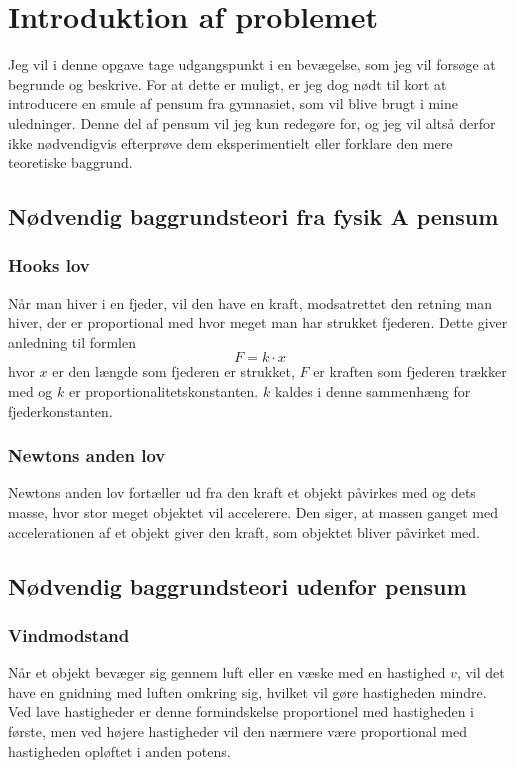 \chapter{Introduktion af problemet}
Jeg vil i denne opgave tage udgangspunkt i en bevægelse, som jeg vil forsøge at begrunde og beskrive. 
For at dette er muligt, er jeg dog nødt til kort at introducere en smule af pensum fra gymnasiet, som vil blive brugt i mine uledninger. 
Denne del af pensum vil jeg kun redegøre for, og jeg vil altså derfor ikke nødvendigvis efterprøve dem eksperimentielt eller forklare den mere teoretiske baggrund. 

\section{Nødvendig baggrundsteori fra fysik A pensum}
\subsection{Hooks lov}\label{teori:Hooks lov}
Når man hiver i en fjeder, vil den have en kraft, modsatrettet den retning man hiver, der er proportional med hvor meget man har strukket fjederen. 
Dette giver anledning til formlen 
$$F =k\cdot x$$
hvor $x$ er den længde som fjederen er strukket, $F$ er kraften som fjederen trækker med og $k$ er proportionalitetskonstanten. 
$k$ kaldes i denne sammenhæng for fjederkonstanten.

\subsection{Newtons anden lov}\label{teori:Newtons anden lov}
Newtons anden lov fortæller ud fra den kraft et objekt påvirkes med og dets masse, hvor stor meget objektet vil accelerere. 
Den siger, at massen ganget med accelerationen af et objekt giver den kraft, som objektet bliver påvirket med.

\section{Nødvendig baggrundsteori udenfor pensum}
\subsection{Vindmodstand}\label{teori:vindmodstand}
Når et objekt bevæger sig gennem luft eller en væske med en hastighed $v$, vil det have en gnidning med luften omkring sig, hvilket vil gøre hastigheden mindre. 
Ved lave hastigheder er denne formindskelse proportionel med hastigheden i første, men ved højere hastigheder vil den nærmere være proportional med hastigheden opløftet i anden potens. 
